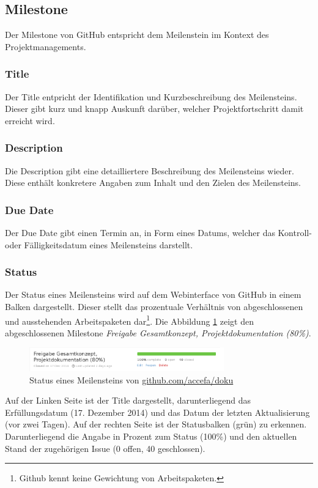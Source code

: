 \subsection{Milestone}
Der \gls{Milestone} von GitHub entspricht dem Meilenstein im Kontext des
Projektmanagements.

\subsubsection{Title}
Der \gls{Title} entpricht der Identifikation und Kurzbeschreibung des
Meilensteins. Dieser gibt kurz und knapp Auskunft darüber, welcher
Projektfortschritt damit erreicht wird.

\subsubsection{Description}
Die \gls{Description} gibt eine detailliertere Beschreibung des Meilensteins
wieder. Diese enthält konkretere Angaben zum Inhalt und den Zielen des
Meilensteins.

\subsubsection{Due Date}
Der \gls{Due Date} gibt einen Termin an, in Form eines Datums, welcher das
Kontroll- oder Fälligkeitsdatum eines Meilensteins darstellt.

\subsubsection{Status}
Der Status eines Meilensteins wird auf dem Webinterface von GitHub in einem
Balken dargestellt. Dieser stellt das prozentuale Verhältnis von
abgeschlossenen und ausstehenden Arbeitspaketen dar\footnote{Github kennt
keine Gewichtung von Arbeitspaketen.}. Die Abbildung
\ref{fig:milestone_progress} zeigt den abgeschlossenen
\gls{Milestone} \emph{Freigabe Gesamtkonzept, Projektdokumentation (80\%)}.
\begin{figure}[h!]
	\centering
	\includegraphics[width=0.75\textwidth]{../../fig/github/milestone_progress.png}
	\caption{Status eines Meilensteins von \url{github.com/accefa/doku}}
	\label{fig:milestone_progress}
\end{figure}

Auf der Linken Seite ist der \gls{Title} dargestellt, darunterliegend das
Erfüllungsdatum (17. Dezember 2014) und das Datum der letzten Aktualisierung
(vor zwei Tagen). Auf der rechten Seite ist der Statusbalken (grün) zu
erkennen. Darunterliegend die Angabe in Prozent zum Status (100\%) und den
aktuellen Stand der zugehörigen \gls{Issue} (0 offen, 40 geschlossen).

